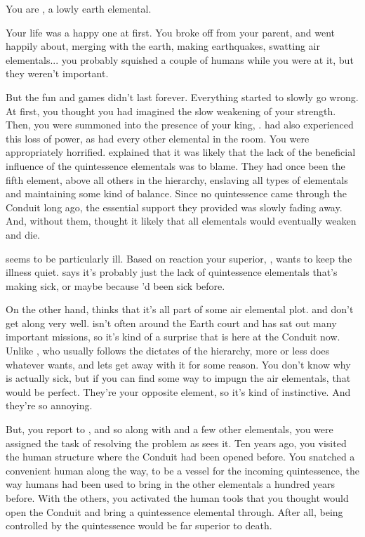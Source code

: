 \documentclass[char]{elementals}
\begin{document}
\name{\cMinion{}}

You are \cMinion{\intro}, a lowly earth elemental.

Your life was a happy one at first.  You broke off from your parent, and went happily about, merging with the earth, making earthquakes, swatting air elementals... you probably squished a couple of humans while you were at it, but they weren't important.

But the fun and games didn't last forever.  Everything started to slowly go wrong.  At first, you thought you had imagined the slow weakening of your strength.  Then, you were summoned into the presence of your king, \cEarthKing{\intro}.  \cEarthKing{\They} had also experienced this loss of power, as had every other elemental in the room.  You were appropriately horrified.  \cEarthKing{} explained that it was likely that the lack of the beneficial influence of the quintessence elementals was to blame.  They had once been the fifth element, above all others in the hierarchy, enslaving all types of elementals and maintaining some kind of balance.  Since no quintessence came through the Conduit long ago, the essential support they provided was slowly fading away.  And, without them, \cEarthKing{} thought it likely that all elementals would eventually weaken and die.  

\cEarthKing{} seems to be particularly ill. Based on \cEarthKing{\their} reaction your superior, \cLoyal{\intro}, wants to keep the illness quiet.  \cLoyal{} says it's probably just the lack of quintessence elementals that's making \cEarthKing{} sick, or maybe because \cEarthKing{\they}'d been sick before.

On the other hand, \cRogue{\intro} thinks that it's all part of some air elemental plot.  \cLoyal{} and \cRogue{} don't get along very well.  \cRogue{} isn't often around the Earth court and has sat out many important missions, so it's kind of a surprise that \cRogue{\they} is here at the Conduit now.  Unlike \cLoyal{}, who usually follows the dictates of the hierarchy, \cRogue{} more or less does whatever \cRogue{\they} wants, and \cEarthKing{} lets \cRogue{\them} get away with it for some reason.  You don't know why \cEarthKing{} is actually sick, but if you can find some way to impugn the air elementals, that would be perfect.  They're your opposite element, so it's kind of instinctive.  And they're so annoying.

But, you report to \cLoyal{}, and so along with \cLoyal{\them} and a few other elementals, you were assigned the task of resolving the problem as \cEarthKing{} sees it.  Ten years ago, you visited the human structure where the Conduit had been opened before.  You snatched a convenient human along the way, to be a vessel for the incoming quintessence, the way humans had been used to bring in the other elementals a hundred years before.  With the others, you activated the human tools that you thought would open the Conduit and bring a quintessence elemental through.  After all, being controlled by the quintessence would be far superior to death.
\end{document}
